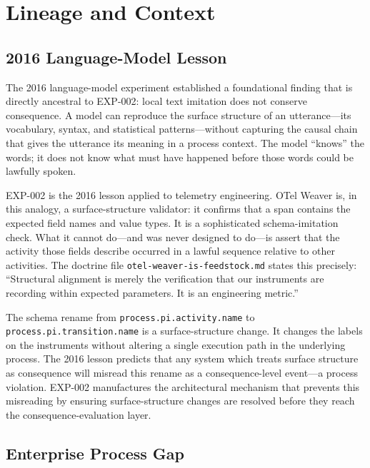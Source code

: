
\section{Lineage and Context}
\label{sec:otel-weaver-exp-002-diff-to-residual-lineage}

\subsection{2016 Language-Model Lesson}
\label{sec:otel-weaver-exp-002-diff-to-residual-lineage-2016}

The 2016 language-model experiment established a foundational finding that is
directly ancestral to EXP-002: local text imitation does not conserve consequence.
A model can reproduce the surface structure of an utterance---its vocabulary,
syntax, and statistical patterns---without capturing the causal chain that gives
the utterance its meaning in a process context. The model ``knows'' the words; it
does not know what must have happened before those words could be lawfully spoken.

EXP-002 is the 2016 lesson applied to telemetry engineering. OTel Weaver is, in
this analogy, a surface-structure validator: it confirms that a span contains the
expected field names and value types. It is a sophisticated schema-imitation check.
What it cannot do---and was never designed to do---is assert that the activity
those fields describe occurred in a lawful sequence relative to other activities.
The doctrine file \texttt{otel-weaver-is-feedstock.md} states this precisely:
``Structural alignment is merely the verification that our instruments are recording
within expected parameters. It is an engineering metric.''

The schema rename from \texttt{process.pi.activity.name} to
\texttt{process.pi.transition.name} is a surface-structure change. It changes the
labels on the instruments without altering a single execution path in the underlying
process. The 2016 lesson predicts that any system which treats surface structure as
consequence will misread this rename as a consequence-level event---a process
violation. EXP-002 manufactures the architectural mechanism that prevents this
misreading by ensuring surface-structure changes are resolved before they reach the
consequence-evaluation layer.

\subsection{Enterprise Process Gap}
\label{sec:otel-weaver-exp-002-diff-to-residual-lineage-enterprise-gap}


